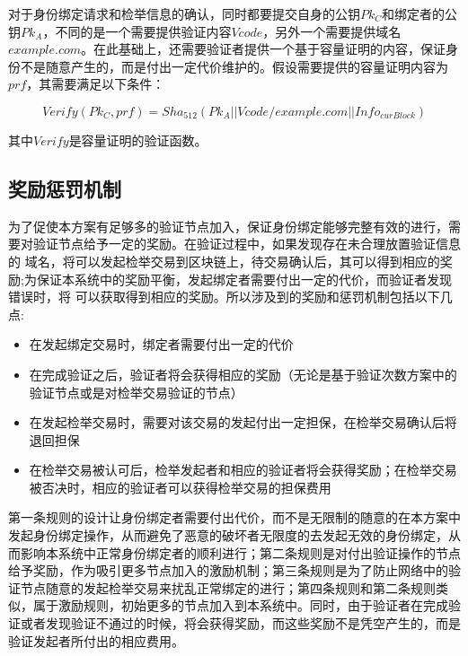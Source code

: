 对于身份绑定请求和检举信息的确认，同时都要提交自身的公钥$Pk_C$和绑定者的公钥$Pk_A$，不同的是一个需要提供验证内容$Vcode$，另外一个需要提供域名$example.com$。在此基础上，还需要验证者提供一个基于容量证明的内容，保证身份不是随意产生的，而是付出一定代价维护的。假设需要提供的容量证明内容为$prf$，其需要满足以下条件：

\begin{equation}\label{pocVerify}
Verify(Pk_C, prf) = Sha_{512}(Pk_A||Vcode/example.com||Info_{curBlock})
\end{equation}

其中$Verify$是容量证明的验证函数。



\subsection{奖励惩罚机制}

为了促使本方案有足够多的验证节点加入，保证身份绑定能够完整有效的进行，需要对验证节点给予一定的奖励。在验证过程中，如果发现存在未合理放置验证信息的 域名，将可以发起检举交易到区块链上，待交易确认后，其可以得到相应的奖励;为保证本系统中的奖励平衡，发起绑定者需要付出一定的代价，而验证者发现错误时，将 可以获取得到相应的奖励。所以涉及到的奖励和惩罚机制包括以下几点:

\begin{itemize}
	\item 在发起绑定交易时，绑定者需要付出一定的代价
	\item 在完成验证之后，验证者将会获得相应的奖励（无论是基于验证次数方案中的验证节点或是对检举交易验证的节点）
	\item 在发起检举交易时，需要对该交易的发起付出一定担保，在检举交易确认后将退回担保
	\item 在检举交易被认可后，检举发起者和相应的验证者将会获得奖励；在检举交易被否决时，相应的验证者可以获得检举交易的担保费用
\end{itemize}

第一条规则的设计让身份绑定者需要付出代价，而不是无限制的随意的在本方案中发起身份绑定操作，从而避免了恶意的破坏者无限度的去发起无效的身份绑定，从而影响本系统中正常身份绑定者的顺利进行；第二条规则是对付出验证操作的节点给予奖励，作为吸引更多节点加入的激励机制；第三条规则是为了防止网络中的验证节点随意的发起检举交易来扰乱正常绑定的进行；第四条规则和第二条规则类似，属于激励规则，初始更多的节点加入到本系统中。同时，由于验证者在完成验证或者发现验证不通过的时候，将会获得奖励，而这些奖励不是凭空产生的，而是验证发起者所付出的相应费用。




